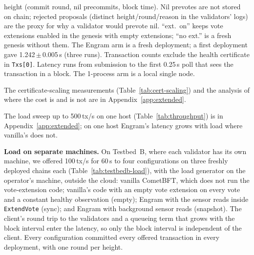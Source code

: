 \begin{table}[tbp]
\begin{minipage}{\linewidth}
height (commit round, nil precommits, block time). Nil prevotes are not stored
on chain; rejected proposals (distinct height/round/reason in the validators'
logs) are the proxy for why a validator would prevote nil. ``ext.\ on'' keeps
vote extensions enabled in the genesis with empty extensions; ``no ext.'' is a
fresh genesis without them. The Engram arm is a fresh deployment; a first
deployment gave 1.242\,$\pm$\,0.005\,s (three runs). Transaction counts exclude
the health certificate in \texttt{Txs[0]}. Latency runs from submission to the
first 0.25\,s poll that sees the transaction in a block. The 1-process arm is a
local single node.
\end{minipage}
\end{table}

The certificate-scaling measurements (Table~\ref{tab:cert-scaling}) and the analysis of where the cost is and is not are in Appendix~\ref{app:extended}.

The load sweep up to 500\,tx/s on one host (Table~\ref{tab:throughput}) is in Appendix~\ref{app:extended}; on one host Engram's latency grows with load where vanilla's does not.

\begin{table}[tbp]
\caption{Load of 100\,tx/s for 60\,s on Testbed~B (mean $\pm$ 95\% Student-$t$ interval over three freshly deployed chains per column, one measurement each). Vanilla ran at commit \texttt{6e010cd} on 12 October; the other three columns at commit \texttt{3fe656d} on 16--17 October. ``Empty ext.'' signs a constant healthy observation without reading any sensor; ``sync'' reads the Bitcoin and Celestia nodes inside \texttt{ExtendVote}; ``snapshot'' composes the latest background reading. The share in \textsc{Anchored} is the fraction of the samples of one validator's FSM state during the measurement.}
\label{tab:testbedb-load}
\centering
\footnotesize

\end{table}

\textbf{Load on separate machines.} On Testbed~B, where each validator has its own machine, we offered 100\,tx/s for 60\,s to four configurations on three freshly deployed chains each (Table~\ref{tab:testbedb-load}), with the load generator on the operator's machine, outside the cloud: vanilla CometBFT, which does not run the vote-extension code; vanilla's code with an empty vote extension on every vote and a constant healthy observation (empty); Engram with the sensor reads inside \texttt{ExtendVote} (sync); and Engram with background sensor reads (snapshot). The client's round trip to the validators and a queueing term that grows with the block interval enter the latency, so only the block interval is independent of the client. Every configuration committed every offered transaction in every deployment, with one round per height.

